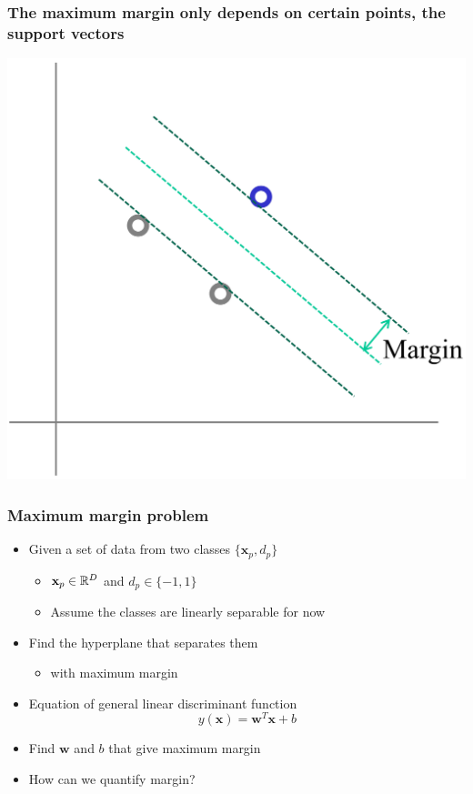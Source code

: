 \documentclass[12pt,notes,mathserif]{beamer}
\begin{document}
\begin{frame}[c]
\frametitle{The maximum margin only depends on certain points, the support vectors}
\begin{center}
\includegraphics[width=0.7\linewidth]{fig8/lec810.jpg}
\end{center}
\end{frame}


\begin{frame}[c]
\frametitle{Maximum margin problem}
\begin{itemize}
\item  Given a set of data from two classes $\{\mathbf{x}_p,d_p\}$
		\begin{itemize}
		\item $\mathbf{x}_p\in \mathbb{R}^D$ and $d_p\in\{-1,1\}$
		\item Assume the classes are linearly separable for now
		\end{itemize}
\item Find the hyperplane that separates them
		\begin{itemize}
		\item with maximum margin
		\end{itemize}
\item Equation of general linear discriminant function
\[y(\mathbf{x})=\mathbf{w}^T\mathbf{x}+b\]

\item Find $\mathbf{w}$ and $b$ that give maximum margin
\item How can we quantify margin?
\end{itemize}

\end{frame}
\end{document}
